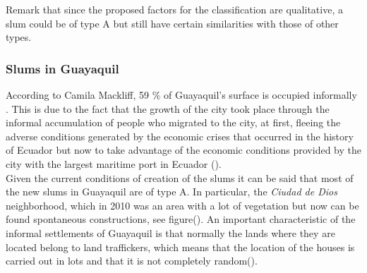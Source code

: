 \documentclass[10pt]{article}
\begin{document}
Remark that since the proposed factors for the classification are qualitative, a slum could be of type A but still have certain similarities with those of other types.

\subsubsection{Slums in Guayaquil}

According to Camila Mackliff, 59 \% of Guayaquil's surface is occupied informally \cite{cam_mac}. This is due to the fact that the growth of the city took place through the informal accumulation of people who migrated to the city, at first, fleeing the adverse conditions generated by the economic crises that occurred in the history of Ecuador but now to take advantage of the economic conditions provided by the city with the largest maritime port in Ecuador ().\\

Given the current conditions of creation of the slums it can be said that most of the new slums in Guayaquil are of type A. In particular, the \emph{Ciudad de Dios} neighborhood, which in 2010 was an area with a lot of vegetation but now can be found spontaneous constructions, see figure(). An important characteristic of the informal settlements of Guayaquil is that normally the lands where they are located belong to land traffickers, which means that the location of the houses is carried out in lots and that it is not completely random().
\end{document}
